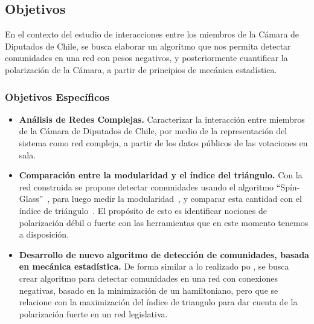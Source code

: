 \documentclass{proyectotesis}
\begin{document}
\subsection{Objetivos}

En el contexto del estudio de interacciones entre los miembros de la Cámara de Diputados de Chile, se busca elaborar un algoritmo que nos permita detectar comunidades en una red con pesos negativos, y posteriormente cuantificar la polarización de la Cámara, a partir de principios de mecánica estadística.


\subsubsection*{Objetivos Específicos}
\begin{itemize}
\item    {\bf Análisis de Redes Complejas.} Caracterizar la interacción entre miembros de la Cámara de Diputados de Chile, por medio de la representación del sistema como red compleja, a partir de los datos públicos de las votaciones en sala.

\item{\bf Comparación entre la modularidad y el índice del triángulo.} Con la red construida se propone detectar comunidades usando el algoritmo ``Spín-Glass''~\cite{reichardt_statistical_2006}, para luego medir la modularidad~\cite{newman_finding_2004}, y comparar esta cantidad con el índice de triángulo~\cite{aref_measuring_2018}. El propósito de esto es identificar nociones de polarización débil o fuerte con las herramientas que en este momento tenemos a disposición.

\item {\bf Desarrollo de nuevo algoritmo de detección de comunidades, basada en mecánica estadística.} De forma similar a lo realizado po \citet{reichardt_statistical_2006}, se busca crear algoritmo para detectar comunidades en una red con conexiones negativas, basado en la minimización de un hamiltoniano, pero que se relacione con la maximización del índice de triangulo para dar cuenta de la polarización fuerte en un red legislativa.

\end{itemize}
\end{document}
